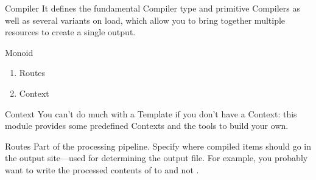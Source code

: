 \documentclass[openany, 12pt]{book}
\begin{document}
\begin{definition}{Compiler}{}
  It defines the fundamental Compiler type and primitive Compilers as well as
  several variants on load, which allow you to bring together multiple
  resources to create a single output.
\end{definition}

\begin{definition}{Monoid}{}
  \begin{multicols}{2}
    \begin{enumerate}[label = {(\arabic*)}]
      \item Routes
      \item Context
    \end{enumerate}
  \end{multicols}
\end{definition}

\begin{definition}{Context}{}
  You can’t do much with a Template if you don’t have a Context: this module
  provides some predefined Contexts and the tools to build your own.
\end{definition}

\begin{definition}{Routes}{}
  Part of the  processing pipeline. Specify where compiled items
  should go in the output site---used for determining the output file. For
  example, you probably want to write the processed contents of
   to  and not
  .
\end{definition}
\end{document}
